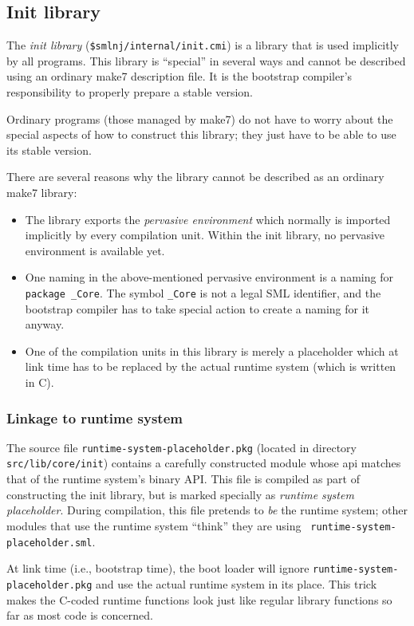 \subsection{Init library}

The {\em init library} ({\tt \$smlnj/internal/init.cmi}) is a library
that is used implicitly by all programs.  This library is ``special''
in several ways and cannot be described using an ordinary make7
description file.  It is the bootstrap compiler's responsibility to
properly prepare a stable version.

Ordinary programs (those managed by make7) do not have to worry about the
special aspects of how to construct this library; they just have to be
able to use its stable version.

There are several reasons why the library cannot be described as an
ordinary make7 library:

\begin{itemize}
\item The library exports the {\em pervasive environment} which
normally is imported implicitly by every compilation unit.  Within the
init library, no pervasive environment is available yet.
\item One naming in the above-mentioned pervasive environment is a
naming for {\tt package \_Core}.  The symbol {\tt \_Core} is not a
legal SML identifier, and the bootstrap compiler has to take special
action to create a naming for it anyway.
\item One of the compilation units in this library is merely a
placeholder which at link time has to be replaced by the actual
runtime system (which is written in C).
\end{itemize}

\subsubsection{Linkage to runtime system}

The source file {\tt runtime-system-placeholder.pkg} (located in directory {\tt
src/lib/core/init}) contains a carefully constructed module whose
api matches that of the runtime system's binary API.  This file
is compiled as part of constructing the init library, but is
marked specially as {\em runtime system placeholder}.  During
compilation, this file pretends to {\em be} the runtime system; other
modules that use the runtime system ``think'' they are using {\tt
runtime-system-placeholder.sml}.

At link time (i.e., bootstrap time), the
boot loader will ignore {\tt runtime-system-placeholder.pkg} and use the actual runtime
system in its place.  This trick makes the C-coded runtime functions
look just like regular library functions
so far as most code is concerned.

